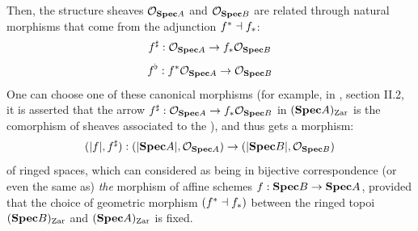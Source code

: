 \begin{remark}
\begin{enumerate}
$$                            $$
                        Then, the structure sheaves $\mathcal{O}_{\mathbf{Spec} A}$ and $\mathcal{O}_{\mathbf{Spec} B}$ are related through natural morphisms that come from the adjunction $f^* \dashv f_*$:
                            $$f^{\sharp}: \mathcal{O}_{\mathbf{Spec} A} \to f_*\mathcal{O}_{\mathbf{Spec} B}$$
                            $$f^{\flat}: f^*\mathcal{O}_{\mathbf{Spec} A} \to \mathcal{O}_{\mathbf{Spec} B}$$
                        One can choose one of these canonical morphisms (for example, in \cite{hartshorne}, section II.2, it is asserted that the arrow $f^{\sharp}: \mathcal{O}_{\mathbf{Spec} A} \to f_*\mathcal{O}_{\mathbf{Spec} B}$ in $(\mathbf{Spec} A)_{\mathrm{Zar}}$ is the comorphism of sheaves associated to the ), and thus gets a morphism:
                            $$(|f|, f^{\sharp}): (|\mathbf{Spec} A|, \mathcal{O}_{\mathbf{Spec} A}) \to (|\mathbf{Spec} B|, \mathcal{O}_{\mathbf{Spec} B})$$
                        of ringed spaces, which can considered as being in bijective correspondence (or even the same as) \textit{the} morphism of affine schemes $f: \mathbf{Spec} B \to \mathbf{Spec} A$, provided that the choice of geometric morphism $(f^* \dashv f_*)$ between the ringed topoi $(\mathbf{Spec} B)_{\mathrm{Zar}}$ and $(\mathbf{Spec} A)_{\mathrm{Zar}}$ is fixed. 
                    \end{enumerate}
                \end{remark}
                    
